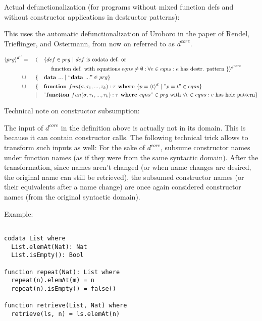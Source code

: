 \documentclass[11pt]{article} %
\begin{document}
Actual defunctionalization (for programs without mixed function defs and without constructor applications in destructor patterns):

This uses the automatic defunctionalization of Uroboro in the paper of Rendel, Trieflinger, and Ostermann, from now on referred to as $d^{core}$.

\begin{alignat*}{3}
\langle prg \rangle^{d''} & = ~&& \langle && \{ def \in prg ~ | ~ def \textrm{ is codata def. or} \\ & && &&\quad \textrm{ function def. with equations } eqns \neq \emptyset: \forall e \in eqns: e \textrm{ has destr. pattern } \} \rangle^{d^{core}} \\
& \cup && \{ && \textrm{\textbf{data }} ... ~ | ~ `` \textrm{\textbf{data }} ... " \in prg \} \\
& \cup && \{ && \textrm{\textbf{function }} fun(\sigma, \tau_1, ..., \tau_k): \tau \textrm{\textbf{ where }} \{ p = \langle t \rangle^d ~ | ~ "p = t" \in eqns \} \\
& && | && `` \textrm{\textbf{function }} fun(\sigma, \tau_1, ..., \tau_k): \tau \textrm{\textbf{ where }} eqns " \in prg \textrm{ with } \forall e \in eqns: e \textrm{ has hole pattern}\} 
\end{alignat*}

Technical note on constructor subsumption:

The input of $d^{core}$ in the definition above is actually not in its domain. This is because it can contain constructor calls. The following technical trick allows to transform such inputs as well: For the sake of $d^{core}$, subsume constructor names under function names (as if they were from the same syntactic domain). After the transformation, since names aren't changed (or when name changes are desired, the original name can still be retrieved), the subsumed constructor names (or their equivalents after a name change) are once again considered constructor names (from the original syntactic domain).

Example:

\begin{lstlisting}

codata List where
  List.elemAt(Nat): Nat
  List.isEmpty(): Bool

function repeat(Nat): List where
  repeat(n).elemAt(m) = n
  repeat(n).isEmpty() = false()

function retrieve(List, Nat) where
  retrieve(ls, n) = ls.elemAt(n)

\end{lstlisting}
\end{document}
